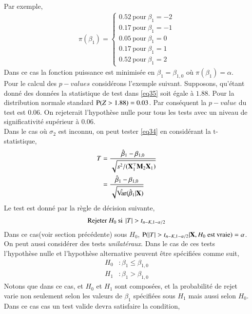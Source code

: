 \documentclass[10pt, reqno]{amsart}
\begin{document}
Par exemple,
\begin{align*}
\pi(\beta_1) =
\left\{
\begin{array}{c}
0.52 \ \textrm{pour} \ \beta_1 = -2\\
0.17 \ \textrm{pour} \ \beta_1 = -1\\
0.05 \ \textrm{pour} \ \beta_1 = 0\\
0.17 \ \textrm{pour} \ \beta_1 = 1\\
0.52 \ \textrm{pour} \ \beta_1 = 2
\end{array}
\right.
\end{align*}
Dans ce cas la fonction puissance est minimisée en $\beta_1 = \beta_{1,0}$ où $\pi(\beta_1) = \alpha$.\\
Pour le calcul des $p-values$ considérons l'exemple suivant. Supposons, qu'étant donné des données la statistique de test  dans \eqref{eq35} soit égale à $1.88$. Pour la distribution normale standard $\operatorname{P}(Z > 1.88) = 0.03$. Par conséquent la $p-value$ du test est $0.06$. On rejeterait l'hypothèse nulle pour tous les tests avec un niveau de significativité supérieur à $0.06$.\\
Dans le cas où $\sigma_2$ est inconnu, on peut tester \eqref{eq34} en considérant la 
$\mathrm{t}$-statistique,
\begin{align}
T&= \frac{\hat{\beta}_1 - \beta_{1,0}}{\sqrt{s^2/(\mathbf X_1^\top\mathbf M_2\mathbf X_1)}}\nonumber\\
&=\frac{\hat{\beta}_1 - \beta_{1,0}}{\sqrt{\hat{\operatorname{Var}}(\hat{\beta}_1 | \mathbf X)}}
\label{eq37}
\end{align}
Le test est donné par la règle de décision suivante,
\begin{align*}
\textrm{Rejeter} \ H_0 \ \textrm{si} \ \left\vert {T} \right\vert > t_{n-K, 1-\alpha/2}
\end{align*}
Dans ce cas(voir section précédente) sous $H_0$, $\operatorname{P}( \left\vert {T} \right\vert > t_{n-K, 1-\alpha/2} | \mathbf X, H_0 \ \textrm{est vraie}) = \alpha$.\\
On peut aussi considérer des tests \emph{unilatéraux}. Dans le cas de ces tests l'hypothèse nulle et l'hypothèse alternative peuvent être spécifiées comme suit,
\begin{align*}
H_0 &:  \beta_1 \leq \beta_{1,0}\\
H_1 &:  \beta_1 > \beta_{1,0}
\end{align*}
Notons que dans ce cas, et $H_0$ et $H_1$ sont composées, et la probabilité de rejet varie non seulement selon les valeurs de $\beta_1$ spécifiées sous $H_1$ mais aussi selon $H_0$. Dans ce cas cas un test valide devra satisfaire la condition,
\end{document}
